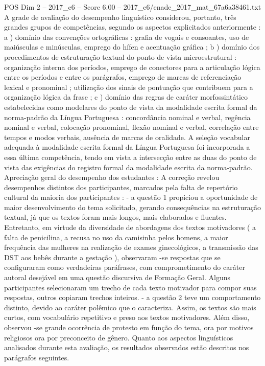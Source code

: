 \begin{textsample}{POS Dim 2 – 2017\_c6 – Score 6.00 – 2017\_c6/enade\_2017\_mat\_67a6a38461.txt}
A grade de avaliação do desempenho linguístico considerou, portanto, três grandes grupos de competências, segundo os aspectos explicitados anteriormente : a ) domínio das convenções ortográficas : grafia de vogais e consoantes, uso de maiúsculas e minúsculas, emprego do hífen e acentuação gráfica ; b ) domínio dos procedimentos de estruturação textual do ponto de vista microestrutural : organização interna dos períodos, emprego de conectores para a articulação lógica entre os períodos e entre os parágrafos, emprego de marcas de referenciação lexical e pronominal ; utilização dos sinais de pontuação que contribuem para a organização lógica da frase ; c ) domínio das regras de caráter morfossintático estabelecidas como modelares do ponto de vista da modalidade escrita formal da norma-padrão da Língua Portuguesa : concordância nominal e verbal, regência nominal e verbal, colocação pronominal, flexão nominal e verbal, correlação entre tempos e modos verbais, ausência de marcas de oralidade.
A seleção vocabular adequada à modalidade escrita formal da Língua Portuguesa foi incorporada a essa última competência, tendo em vista a intersecção entre as duas do ponto de vista das exigências do registro formal da modalidade escrita da norma-padrão.
Apreciação geral do desempenho dos estudantes : A correção revelou desempenhos distintos dos participantes, marcados pela falta de repertório cultural da maioria dos participantes : - a questão 1 propiciou a oportunidade de maior desenvolvimento do tema solicitado, gerando consequências na estruturação textual, já que os textos foram mais longos, mais elaborados e fluentes.
Entretanto, em virtude da diversidade de abordagens dos textos motivadores ( a falta de penicilina, a recusa no uso da camisinha pelos homens, a maior frequência das mulheres na realização de exames ginecológicos, a transmissão das DST aos bebês durante a gestação ), observaram -se respostas que se configuraram como verdadeiras paráfrases, com comprometimento do caráter autoral desejável em uma questão discursiva de Formação Geral.
Alguns participantes selecionaram um trecho de cada texto motivador para compor suas respostas, outros copiaram trechos inteiros. - a questão 2 teve um comportamento distinto, devido ao caráter polêmico que o caracteriza.
Assim, os textos são mais curtos, com vocabulário repetitivo e preso aos textos motivadores.
Além disso, observou -se grande ocorrência de protesto em função do tema, ora por motivos religiosos ora por preconceito de gênero.
Quanto aos aspectos linguísticos analisados durante esta avaliação, os resultados observados estão descritos nos parágrafos seguintes.

\end{textsample}
